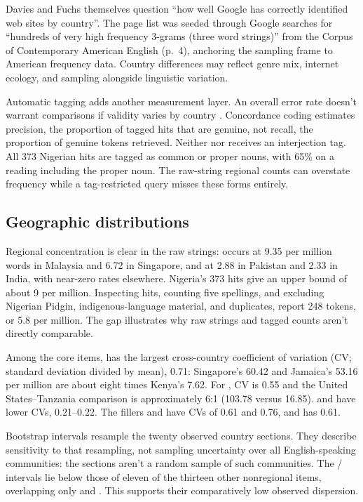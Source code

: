 \documentclass[12pt]{article}
\begin{document}
Davies and Fuchs themselves question \enquote{how well Google has correctly identified web sites by country}. The page list was seeded through Google searches for \enquote{hundreds of very high frequency 3-grams (three word strings)} from the Corpus of Contemporary American English (p.~4), anchoring the sampling frame to American frequency data. Country differences may reflect genre mix, internet ecology, and sampling alongside linguistic variation.

Automatic tagging adds another measurement layer. An overall error rate doesn't warrant comparisons if validity varies by country \citep{reynolds2026didcorpus}. Concordance coding estimates precision, the proportion of tagged hits that are genuine, not recall, the proportion of genuine tokens retrieved. Neither  nor  receives an interjection tag. All 373 Nigerian  hits are tagged as common or proper nouns, with 65\% on a reading including the proper noun. The raw-string regional counts can overstate frequency while a tag-restricted query misses these forms entirely.

\subsection{Geographic distributions}

Regional concentration is clear in the raw strings:  occurs at 9.35 per million words in Malaysia and 6.72 in Singapore, and  at 2.88 in Pakistan and 2.33 in India, with near-zero rates elsewhere. Nigeria's 373  hits give an upper bound of about 9 per million. Inspecting hits, counting five spellings, and excluding Nigerian Pidgin, indigenous-language material, and duplicates, \textcite[69]{unuabonahdaniel2020} report 248 tokens, or 5.8 per million. The gap illustrates why raw strings and tagged counts aren't directly comparable.

Among the core items,  has the largest cross-country coefficient of variation (CV; standard deviation divided by mean), 0.71: Singapore's 60.42 and Jamaica's 53.16 per million are about eight times Kenya's 7.62. For , CV is 0.55 and the United States--Tanzania comparison is approximately 6:1 (103.78 versus 16.85).  and  have lower CVs, 0.21--0.22. The fillers  and  have CVs of 0.61 and 0.76, and  has 0.61.

Bootstrap intervals resample the twenty observed country sections. They describe sensitivity to that resampling, not sampling uncertainty over all English-speaking communities: the sections aren't a random sample of such communities. The / intervals lie below those of eleven of the thirteen other nonregional items, overlapping only  and . This supports their comparatively low observed dispersion. 
\end{document}
